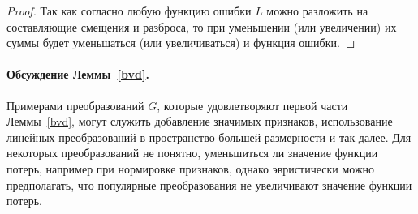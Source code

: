        \begin{proof}
            Так как согласно \cite{domingos2000unified} любую функцию ошибки $L$ можно разложить на составляющие смещения и разброса, то при уменьшении (или увеличении) их суммы будет уменьшаться (или увеличиваться) и функция ошибки.
        \end{proof}

        \paragraph{Обсуждение Леммы~\ref{bvd}.} Примерами преобразований $G$, которые удовлетворяют первой части Леммы~\ref{bvd}, могут служить добавление значимых признаков, использование линейных преобразований в пространство большей размерности и так далее. Для некоторых преобразований не понятно, уменьшиться ли значение функции потерь, например при нормировке признаков, однако эвристически можно предполагать, что популярные преобразования не увеличивают значение функции потерь.



        

        


        

    
    

        
